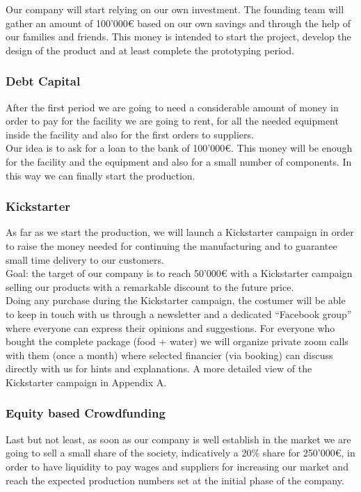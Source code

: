 Our company will start relying on our own investment. The founding team will gather an amount of 100'000€ based on our own savings and through the help of our families and friends. This money is intended to start the project, develop the design of the product and at least complete the prototyping period. 

\subsubsection*{Debt Capital} 

After the first period we are going to need a considerable amount of money in order to pay for the facility we are going to rent, for all the needed equipment inside the facility and also for the first orders to suppliers.\\
Our idea is to ask for a loan to the bank of 100'000€. This money will be enough for the facility and the equipment and also for a small number of components. In this way we can finally start the production.

\subsubsection*{Kickstarter}

As far as we start the production, we will launch a Kickstarter campaign in order to raise the money needed for continuing the manufacturing and to guarantee small time delivery to our customers. \\
Goal: the target of our company is to reach 50'000€ with a Kickstarter campaign selling our products with a remarkable discount to the future price. \\
Doing any purchase during the Kickstarter campaign, the costumer will be able to keep in touch with us through a newsletter and a dedicated “Facebook group” where everyone can express their opinions and suggestions. For everyone who bought the complete package (food + water) we will organize private zoom calls with them (once a month) where selected financier (via booking) can discuss directly with us for hints and explanations. A more detailed view of the Kickstarter campaign in Appendix A.

\subsubsection*{Equity based Crowdfunding} 

Last but not least, as soon as our company is well establish in the market we are going to sell a small share of the society, indicatively a 20\% share for 250'000€, in order to have liquidity to pay wages and suppliers for increasing our market and reach the expected production numbers set at the initial phase of the company. 



